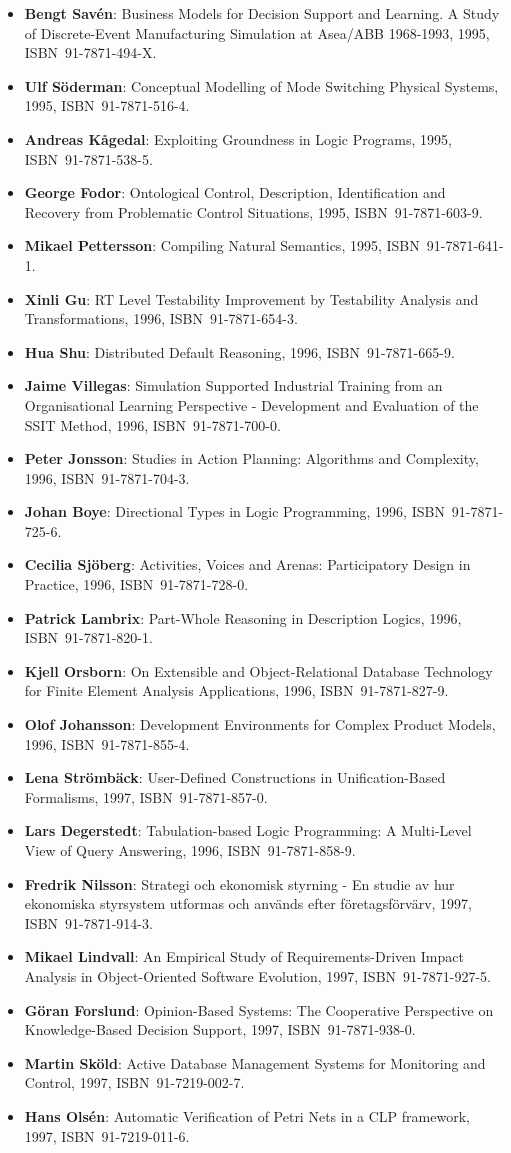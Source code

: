 \documentclass[a4paper,showtrims,twocolumn]{memoir}
\newenvironment{theses}{
  \begin{itemize}
    \setlength{\itemsep}{0.2em}
    \setlength{\parskip}{0em}
    \setlength{\parsep}{0em}
}{
  \end{itemize}
}
\newcommand{\thesis}[5]{\item[No.~#1] \textbf{#2}: #3, #4, ISBN~#5.}
\begin{document}
\begin{theses}
    \thesis{371}{Bengt Savén}{Business Models for Decision Support and Learning. A Study of Discrete-Event Manufacturing Simulation at Asea/ABB 1968-1993}{1995}{91-7871-494-X}
    \thesis{375}{Ulf Söderman}{Conceptual Modelling of Mode Switching Physical Systems}{1995}{91-7871-516-4}
    \thesis{383}{Andreas Kågedal}{Exploiting Groundness in Logic Programs}{1995}{91-7871-538-5}
    \thesis{396}{George Fodor}{Ontological Control, Description, Identification and Recovery from Problematic Control Situations}{1995}{91-7871-603-9}
    \thesis{413}{Mikael Pettersson}{Compiling Natural Semantics}{1995}{91-7871-641-1}
    \thesis{414}{Xinli Gu}{RT Level Testability Improvement by Testability Analysis and Transformations}{1996}{91-7871-654-3}
    \thesis{416}{Hua Shu}{Distributed Default Reasoning}{1996}{91-7871-665-9}
    \thesis{429}{Jaime Villegas}{Simulation Supported Industrial Training from an Organisational Learning Perspective - Development and Evaluation of the SSIT Method}{1996}{91-7871-700-0}
    \thesis{431}{Peter Jonsson}{Studies in Action Planning: Algorithms and Complexity}{1996}{91-7871-704-3}
    \thesis{437}{Johan Boye}{Directional Types in Logic Programming}{1996}{91-7871-725-6}
    \thesis{439}{Cecilia Sjöberg}{Activities, Voices and Arenas: Participatory Design in Practice}{1996}{91-7871-728-0}
    \thesis{448}{Patrick Lambrix}{Part-Whole Reasoning in Description Logics}{1996}{91-7871-820-1}
    \thesis{452}{Kjell Orsborn}{On Extensible and Object-Relational Database Technology for Finite Element Analysis Applications}{1996}{91-7871-827-9}
    \thesis{459}{Olof Johansson}{Development Environments for Complex Product Models}{1996}{91-7871-855-4}
    \thesis{461}{Lena Strömbäck}{User-Defined Constructions in Unification-Based Formalisms}{1997}{91-7871-857-0}
    \thesis{462}{Lars Degerstedt}{Tabulation-based Logic Programming: A Multi-Level View of Query Answering}{1996}{91-7871-858-9}
    \thesis{475}{Fredrik Nilsson}{Strategi och ekonomisk styrning - En studie av hur ekonomiska styrsystem utformas och används efter företagsförvärv}{1997}{91-7871-914-3}
    \thesis{480}{Mikael Lindvall}{An Empirical Study of Requirements-Driven Impact Analysis in Object-Oriented Software Evolution}{1997}{91-7871-927-5}
    \thesis{485}{Göran Forslund}{Opinion-Based Systems: The Cooperative Perspective on Knowledge-Based Decision Support}{1997}{91-7871-938-0}
    \thesis{494}{Martin Sköld}{Active Database Management Systems for Monitoring and Control}{1997}{91-7219-002-7}
    \thesis{495}{Hans Olsén}{Automatic Verification of Petri Nets in a CLP framework}{1997}{91-7219-011-6}

\end{theses}
\end{document}
